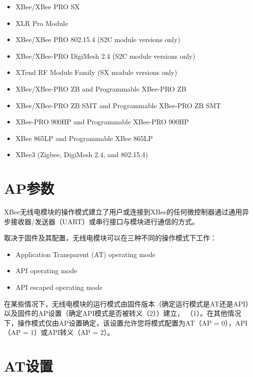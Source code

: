 \begin{itemize}
    \item XBee/XBee PRO SX
    \item XLR Pro Module
    \item XBee/XBee PRO 802.15.4 (S2C module versions only)
    \item XBee/XBee-PRO DigiMesh 2.4 (S2C module versions only)
    \item XTend RF Module Family (SX module versions only)
    \item XBee/XBee-PRO ZB and Programmable XBee-PRO ZB
    \item XBee/XBee-PRO ZB SMT and Programmable XBee-PRO ZB SMT
    \item XBee-PRO 900HP and Programmable XBee-PRO 900HP
    \item XBee 865LP and Programmable XBee 865LP
    \item XBee3 (Zigbee, DigiMesh 2.4, and 802.15.4)
\end{itemize}

\section{AP参数}

XBee无线电模块的操作模式建立了用户或连接到XBee的任何微控制器通过通用异步接收器/发送器（UART）或串行接口与模块进行通信的方式。

取决于固件及其配置，无线电模块可以在三种不同的操作模式下工作：

\begin{itemize}
    \item Application Transparent (AT) operating mode
    \item API operating mode
    \item API escaped operating mode
\end{itemize}

在某些情况下，无线电模块的运行模式由固件版本（确定运行模式是AT还是API）以及固件的AP设置（确定API模式是否被转义（2））建立， （1）。在其他情况下，操作模式仅由AP设置确定，该设置允许您将模式配置为AT（AP = 0），API（AP = 1）或API转义（AP = 2）。
\section{AT设置}

